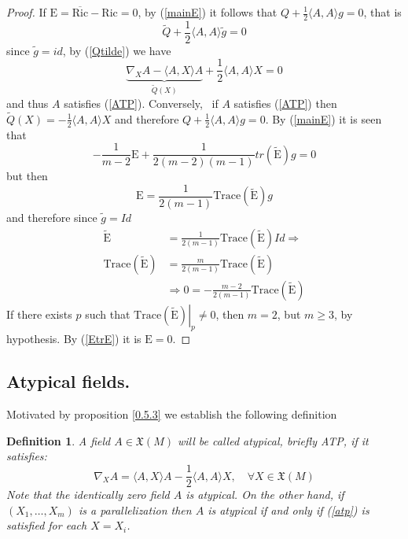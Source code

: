 \documentclass{amsart}%
\theoremstyle{plain}
\newtheorem{definition}{Definition}
\numberwithin{equation}{section}
\begin{document}
\begin{proof}
If $\mathrm{E}=\overline{\mathrm{Ric}}-\mathrm{Ric}=0$, by (\ref{mainE}) it
follows that $Q+\frac{1}{2}\langle A,A\rangle g=0$, that is
\[
\widetilde{Q}+\frac{1}{2}\langle A,A\rangle\widetilde{g}=0
\]
since $\widetilde{g}=id$, by (\ref{Qtilde}) we have
\[
\underset{\widetilde{Q}\left(  X\right)  }{\underbrace{\nabla_{X}A-\langle
A,X\rangle A}}+\frac{1}{2}\langle A,A\rangle X=0
\]
and thus $A$ satisfies (\ref{ATP}). Conversely, \ if $A$ satisfies (\ref{ATP})
then $\widetilde{Q}\left(  X\right)  =-\frac{1}{2}\langle A,A\rangle X$ and
therefore $Q+\frac{1}{2}\langle A,A\rangle g=0$. By (\ref{mainE}) it is seen
that%
\begin{equation}
-\frac{1}{m-2}\mathrm{E}+\frac{1}{2\left(  m-2\right)  \left(  m-1\right)
}tr\left(  \widetilde{\mathrm{E}}\right)  g=0\label{EtrE}%
\end{equation}
but then
\begin{equation}
\mathrm{E}=\frac{1}{2\left(  m-1\right)  }\mathrm{Trace}\left(  \widetilde
{\mathrm{E}}\right)  g\label{EEtilde}%
\end{equation}
and therefore since $\widetilde{g}=Id$
\begin{align*}
\widetilde{\mathrm{E}} &  =\frac{1}{2\left(  m-1\right)  }\mathrm{Trace}%
\left(  \widetilde{\mathrm{E}}\right)  Id\Rightarrow\\
\mathrm{Trace}\left(  \widetilde{\mathrm{E}}\right)   &  =\frac{m}{2\left(
m-1\right)  }\mathrm{Trace}\left(  \widetilde{\mathrm{E}}\right)  \\
&  \Rightarrow0=-\frac{m-2}{2\left(  m-1\right)  }\mathrm{Trace}\left(
\widetilde{\mathrm{E}}\right)
\end{align*}
If there exists $p$ such that $\left.  \mathrm{Trace}\left(  \widetilde
{\mathrm{E}}\right)  \right\vert _{p}\neq0$, then $m=2$, but $m\geq3$, by
hypothesis. By (\ref{EtrE}) it is $\mathrm{E}=0.$
\end{proof}

\subsection{Atypical fields.}

Motivated by proposition \ref{0.5.3} we establish the following definition

\begin{definition}
\label{0.5.2} A field $A\in\mathfrak{X}(M)$ will be called atypical, briefly
ATP, if it satisfies:
\begin{equation}
\nabla_{X}A=\langle A,X\rangle A-\frac{1}{2}\langle A,A\rangle X,\quad\forall
X\in\mathfrak{X}(M) \label{atp}%
\end{equation}
Note that the identically zero field $A$ is atypical. On the other hand, if
$\left(  X_{1},\ldots,X_{m}\right)  $ is a parallelization then $A$ is
atypical if and only if (\ref{atp}) is satisfied for each $X=X_{i}$.
\end{definition}
\end{document}

